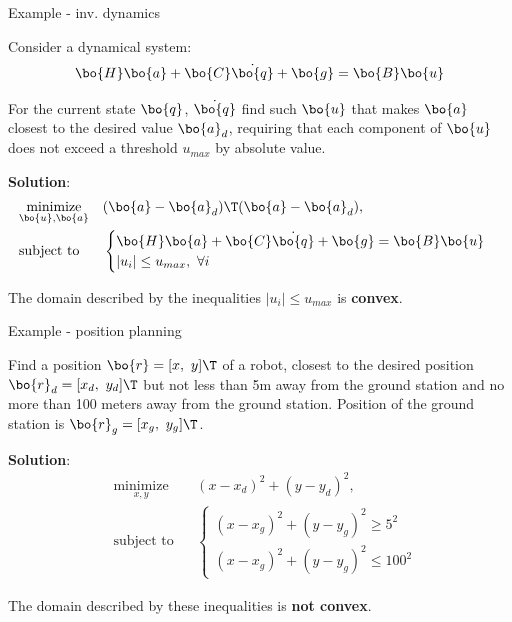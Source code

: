 \documentclass{beamer}
\begin{document}
\begin{frame}{Example - inv. dynamics}
	\begin{flushleft}
		
		Consider a dynamical system:
		\begin{equation}
			\bo{H} \bo{a} + \bo{C}\dot{\bo{q}} + \bo{g} = \bo{B}\bo{u}
		\end{equation}		
		
		For the current state $\bo{q}$, $\dot{\bo{q}}$ find such $\bo{u}$ that makes $\bo{a}$ closest to the desired value $\bo{a}_d$, \textcolor{mydarkred}{ requiring that each component of $\bo{u}$ does not exceed a threshold $u_{max}$ by absolute value.}
		
		\bigskip
		
		\textbf{Solution}:
		\begin{equation}
			\begin{aligned}
				& \underset{\bo{u}, \bo{a}}{\text{minimize}}
				& & (\bo{a}-\bo{a}_d)\T (\bo{a}-\bo{a}_d), \\
				& \text{subject to}
				& & \begin{cases}
					\bo{H} \bo{a} + \bo{C}\dot{\bo{q}} + \bo{g} = \bo{B}\bo{u} \\
					|u_i| \leq u_{max}, \ \forall i
				\end{cases}
			\end{aligned}
		\end{equation}
		
		The domain described by the inequalities $|u_i| \leq u_{max}$ is \textbf{convex}.
		
	\end{flushleft}
\end{frame}



\begin{frame}{Example - position planning}
	\begin{flushleft}
		
		Find a position $\bo{r} = [x, \ y]\T$ of a robot, closest to the desired position $\bo{r}_d= [x_d, \ y_d]\T$ but \textcolor{mydarkred}{not less than 5m away from the ground station and no more than 100 meters away from the ground station.} Position of the ground station is $\bo{r}_g= [x_g, \ y_g]\T$.
		
		\bigskip
		
		\textbf{Solution}:
		\begin{equation}
			\begin{aligned}
				& \underset{x, y}{\text{minimize}}
				& & (x-x_d)^2 + (y-y_d)^2, \\
				& \text{subject to}
				& & \begin{cases}
					(x-x_g)^2 + (y-y_g)^2 \ge 5^2 \\
					(x-x_g)^2 + (y-y_g)^2 \le 100^2
				\end{cases}
			\end{aligned}
		\end{equation}
		
		The domain described by these inequalities is \textbf{not convex}.
		
	\end{flushleft}
\end{frame}
\end{document}
